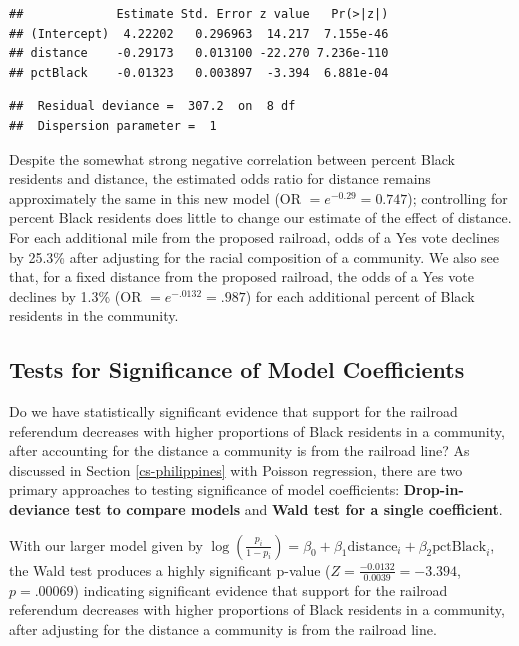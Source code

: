\documentclass[
]{krantz}
\begin{document}
\begin{verbatim}
##             Estimate Std. Error z value   Pr(>|z|)
## (Intercept)  4.22202   0.296963  14.217  7.155e-46
## distance    -0.29173   0.013100 -22.270 7.236e-110
## pctBlack    -0.01323   0.003897  -3.394  6.881e-04
\end{verbatim}

\begin{verbatim}
##  Residual deviance =  307.2  on  8 df 
##  Dispersion parameter =  1
\end{verbatim}

Despite the somewhat strong negative correlation between percent Black residents and distance, the estimated odds ratio for distance remains approximately the same in this new model (OR \(= e^{-0.29} = 0.747\)); controlling for percent Black residents does little to change our estimate of the effect of distance. For each additional mile from the proposed railroad, odds of a Yes vote declines by 25.3\% after adjusting for the racial composition of a community. We also see that, for a fixed distance from the proposed railroad, the odds of a Yes vote declines by 1.3\% (OR \(= e^{-.0132} = .987\)) for each additional percent of Black residents in the community.

\subsection{Tests for Significance of Model Coefficients}\label{sec-logisticInf}

Do we have statistically significant evidence that support for the railroad referendum decreases with higher proportions of Black residents in a community, after accounting for the distance a community is from the railroad line? As discussed in Section \ref{cs-philippines} with Poisson regression, there are two primary approaches to testing significance of model coefficients: \textbf{Drop-in-deviance test to compare models}  and \textbf{Wald test for a single coefficient}. 

With our larger model given by \(\log\left(\frac{p_i}{1-p_i}\right) = \beta_0+\beta_1\textrm{distance}_i+\beta_2\textrm{pctBlack}_i\), the Wald test produces a highly significant p-value (\(Z=\frac{-0.0132}{0.0039}= -3.394\), \(p=.00069\)) indicating significant evidence that support for the railroad referendum decreases with higher proportions of Black residents in a community, after adjusting for the distance a community is from the railroad line.
\end{document}
